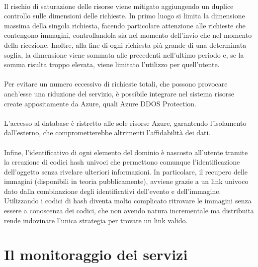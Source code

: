 \\
Il rischio di saturazione delle risorse viene mitigato
aggiungendo un duplice controllo sulle dimensioni delle richieste.
In primo luogo si limita la dimensione massima della singola richiesta,
facendo particolare attenzione alle richieste che contengono immagini,
controllandola sia nel momento dell'invio che nel momento della ricezione.
Inoltre, alla fine di ogni richiesta più grande di una determinata soglia,
la dimensione viene sommata alle precedenti nell'ultimo periodo e,
se la somma risulta troppo elevata, viene limitato l'utilizzo per quell'utente.\\
\\
Per evitare un numero eccessivo di richieste totali,
che possono provocare anch'esse una riduzione del servizio,
è possibile integrare nel sistema risorse create appositamente da Azure,
quali Azure DDOS Protection.\\
\\
L’accesso al database è ristretto alle sole risorse Azure,
garantendo l’isolamento dall’esterno,
che comprometterebbe altrimenti l’affidabilità dei dati.\\
\\
Infine, l’identificativo di ogni elemento del dominio è nascosto all’utente
tramite la creazione di codici hash univoci
che permettono comunque l'identificazione dell'oggetto senza rivelare ulteriori informazioni.
In particolare, il recupero delle immagini (disponibili in teoria pubblicamente),
avviene grazie a un link univoco dato dalla combinazione degli identificativi dell'evento e dell'immagine.
Utilizzando i codici di hash diventa molto complicato ritrovare le immagini
senza essere a conoscenza dei codici,
che non avendo natura incrementale ma distribuita rende
indovinare l'unica strategia per trovare un link valido.


\section{Il monitoraggio dei servizi}

